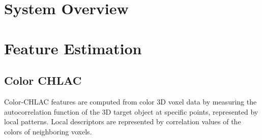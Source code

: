 \documentclass[conference]{sty/IEEEtran}
\begin{document}
\section{System Overview} 


\section{Feature Estimation}

\subsection{Color CHLAC}
Color-CHLAC features are computed from color 3D voxel data by measuring 
    the autocorrelation function of the 3D target object at specific points, 
    represented by local patterns.
Local descriptors are represented by correlation values of the colors of neighboring voxels.
\end{document}
